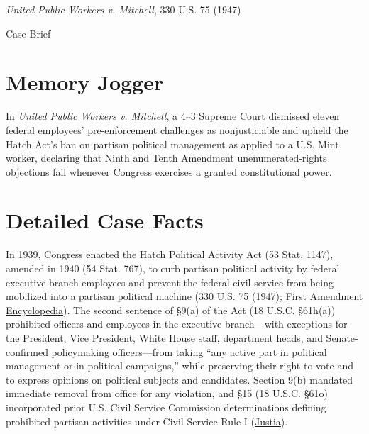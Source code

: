 \documentclass[12pt]{article}
\begin{document}
\begin{center}
{\LARGE \textit{United Public Workers v. Mitchell}, 330 U.S. 75 (1947)\par}
\vspace{0.8em}
{\large Case Brief\par}
\end{center}
\vspace{1em}

\section{Memory Jogger}

In \href{https://www.courtlistener.com/opinion/104374/united-public-workers-of-america-v-mitchell/}{\textit{United Public Workers v. Mitchell}}, a 4--3 Supreme Court dismissed eleven federal employees' pre-enforcement challenges as nonjusticiable and upheld the Hatch Act's ban on partisan political management as applied to a U.S. Mint worker, declaring that Ninth and Tenth Amendment unenumerated-rights objections fail whenever Congress exercises a granted constitutional power.

\section{Detailed Case Facts}

In 1939, Congress enacted the Hatch Political Activity Act (53 Stat. 1147), amended in 1940 (54 Stat. 767), to curb partisan political activity by federal executive-branch employees and prevent the federal civil service from being mobilized into a partisan political machine (\href{https://www.law.cornell.edu/supremecourt/text/330/75}{330 U.S. 75 (1947)}; \href{https://firstamendment.mtsu.edu/article/united-public-workers-of-america-v-mitchell/}{First Amendment Encyclopedia}). The second sentence of \S 9(a) of the Act (18 U.S.C. \S 61h(a)) prohibited officers and employees in the executive branch---with exceptions for the President, Vice President, White House staff, department heads, and Senate-confirmed policymaking officers---from taking ``any active part in political management or in political campaigns,'' while preserving their right to vote and to express opinions on political subjects and candidates. Section 9(b) mandated immediate removal from office for any violation, and \S 15 (18 U.S.C. \S 61o) incorporated prior U.S. Civil Service Commission determinations defining prohibited partisan activities under Civil Service Rule I (\href{https://supreme.justia.com/cases/federal/us/330/75/}{Justia}).
\end{document}
